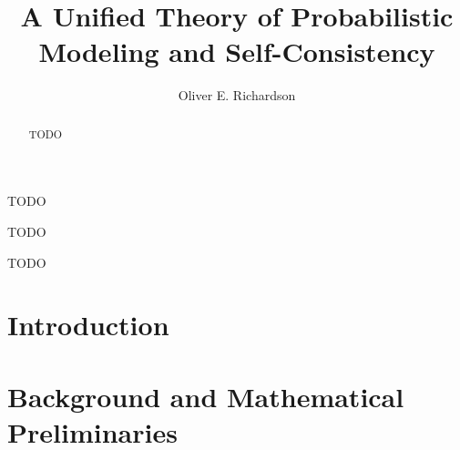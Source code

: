 \documentclass[tocprelim,
    ]{cornellmodified}
\title {%
    A Unified Theory of Probabilistic Modeling and Self-Consistency
}
\author {Oliver E. Richardson}
\begin{document}
\maketitle
\makecopyright

\begin{abstract}
TODO
\end{abstract}

\begin{biosketch}
TODO
\end{biosketch}

\begin{dedication}
TODO
\end{dedication}

\begin{acknowledgements}
TODO


\end{acknowledgements}

\renewcommand{\thepart}{Part~\Roman{part} :}
\contentspage
\figurelistpage

\normalspacing \setcounter{page}{1} 
\pagestyle{cornell} \addtolength{\parskip}{0.5\baselineskip}


\chapter{Introduction}
    
\chapter{Background and Mathematical Preliminaries}
    
\end{document}
